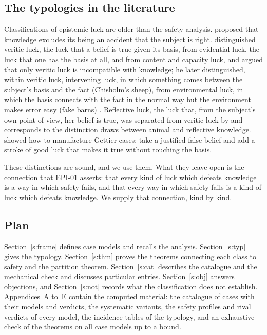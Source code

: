 \documentclass{situationist-preprint}
\begin{document}
\subsection{The typologies in the literature}

Classifications of epistemic luck are older than the safety analysis. \citet{Unger1968} proposed that knowledge excludes its being an accident that the subject is right. \citet{Pritchard2005} distinguished veritic luck, the luck that a belief is true given its basis, from evidential luck, the luck that one has the basis at all, and from content and capacity luck, and argued that only veritic luck is incompatible with knowledge; he later distinguished, within veritic luck, intervening luck, in which something comes between the subject's basis and the fact (Chisholm's sheep), from environmental luck, in which the basis connects with the fact in the normal way but the environment makes error easy (fake barns) \citep{Pritchard2012}. Reflective luck, the luck that, from the subject's own point of view, her belief is true, was separated from veritic luck by \citet{Pritchard2005} and corresponds to the distinction \citet{Sosa2007} draws between animal and reflective knowledge. \citet{Zagzebski1994} showed how to manufacture Gettier cases: take a justified false belief and add a stroke of good luck that makes it true without touching the basis.

These distinctions are sound, and we use them. What they leave open is the connection that EPI-01 asserts: that every kind of luck which defeats knowledge is a way in which safety fails, and that every way in which safety fails is a kind of luck which defeats knowledge. We supply that connection, kind by kind.

\subsection{Plan}

Section~\ref{s:frame} defines case models and recalls the analysis. Section~\ref{s:typ} gives the typology. Section~\ref{s:thm} proves the theorems connecting each class to safety and the partition theorem. Section~\ref{s:cat} describes the catalogue and the mechanical check and discusses particular entries. Section~\ref{s:obj} answers objections, and Section~\ref{s:not} records what the classification does not establish. Appendices~A to~E contain the computed material: the catalogue of cases with their models and verdicts, the systematic variants, the safety profiles and rival verdicts of every model, the incidence tables of the typology, and an exhaustive check of the theorems on all case models up to a bound.
\end{document}
